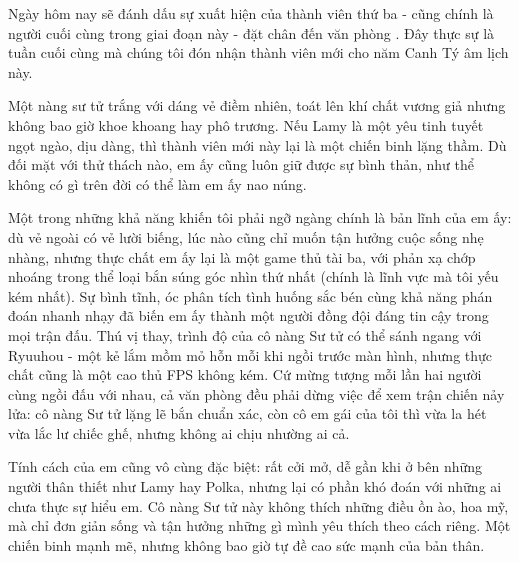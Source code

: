\documentclass[../main.tex]{subfiles}
\begin{document}


Ngày hôm nay sẽ đánh dấu sự xuất hiện của thành viên thứ ba - cũng chính là người cuối cùng trong giai đoạn này - đặt chân đến văn phòng \hll. Đây thực sự là tuần cuối cùng mà chúng tôi đón nhận thành viên mới cho năm Canh Tý âm lịch này.

Một nàng sư tử trắng với dáng vẻ điềm nhiên, toát lên khí chất vương giả nhưng không bao giờ khoe khoang hay phô trương. Nếu Lamy là một yêu tinh tuyết ngọt ngào, dịu dàng, thì thành viên mới này lại là một chiến binh lặng thầm. Dù đối mặt với thử thách nào, em ấy cũng luôn giữ được sự bình thản, như thể không có gì trên đời có thể làm em ấy nao núng.

Một trong những khả năng khiến tôi phải ngỡ ngàng chính là bản lĩnh của em ấy: dù vẻ ngoài có vẻ lười biếng, lúc nào cũng chỉ muốn tận hưởng cuộc sống nhẹ nhàng, nhưng thực chất em ấy lại là một game thủ tài ba, với phản xạ chớp nhoáng trong thể loại bắn súng góc nhìn thứ nhất (chính là lĩnh vực mà tôi yếu kém nhất). Sự bình tĩnh, óc phân tích tình huống sắc bén cùng khả năng phán đoán nhanh nhạy đã biến em ấy thành một người đồng đội đáng tin cậy trong mọi trận đấu. Thú vị thay, trình độ của cô nàng Sư tử có thể sánh ngang với Ryuuhou - một kẻ lắm mồm mỏ hỗn mỗi khi ngồi trước màn hình, nhưng thực chất cũng là một cao thủ FPS không kém. Cứ mừng tượng mỗi lần hai người cùng ngồi đấu với nhau, cả văn phòng đều phải dừng việc để xem trận chiến nảy lửa: cô nàng Sư tử lặng lẽ bắn chuẩn xác, còn cô em gái của tôi thì vừa la hét vừa lắc lư chiếc ghế, nhưng không ai chịu nhường ai cả.

Tính cách của em cũng vô cùng đặc biệt: rất cởi mở, dễ gần khi ở bên những người thân thiết như Lamy hay Polka, nhưng lại có phần khó đoán với những ai chưa thực sự hiểu em. Cô nàng Sư tử này không thích những điều ồn ào, hoa mỹ, mà chỉ đơn giản sống và tận hưởng những gì mình yêu thích theo cách riêng. Một chiến binh mạnh mẽ, nhưng không bao giờ tự đề cao sức mạnh của bản thân.
\end{document}
